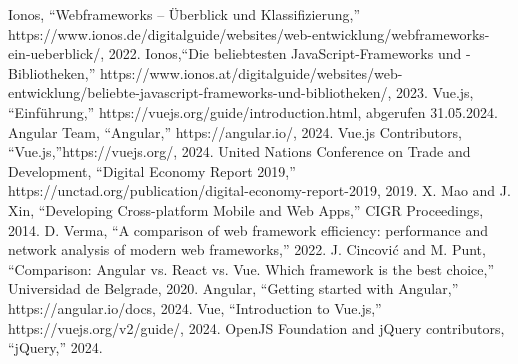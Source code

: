 \documentclass[conference]{IEEEtran}
\begin{document}
\begin{thebibliography}{00}
 Ionos, ``Webframeworks – Überblick und Klassifizierung,'' https://www.ionos.de/digitalguide/websites/web-entwicklung/webframeworks-ein-ueberblick/, 2022.
 Ionos,``Die beliebtesten JavaScript-Frameworks und -Bibliotheken,'' https://www.ionos.at/digitalguide/websites/web-entwicklung/beliebte-javascript-frameworks-und-bibliotheken/, 2023.
 Vue.js, ``Einführung,'' https://vuejs.org/guide/introduction.html, abgerufen 31.05.2024.
 Angular Team, ``Angular,'' https://angular.io/, 2024.
 Vue.js Contributors, ``Vue.js,''https://vuejs.org/, 2024.
 United Nations Conference on Trade and Development, ``Digital Economy Report 2019,'' https://unctad.org/publication/digital-economy-report-2019, 2019.
 X. Mao and J. Xin, ``Developing Cross-platform Mobile and Web Apps,'' CIGR Proceedings, 2014.
 D. Verma, ``A comparison of web framework efficiency: performance and network analysis of modern web frameworks,'' 2022.
 J. Cincović and M. Punt, ``Comparison: Angular vs. React vs. Vue. Which framework is the best choice,'' Universidad de Belgrade, 2020.
 Angular, ``Getting started with Angular,'' https://angular.io/docs, 2024.
 Vue, ``Introduction to Vue.js,'' https://vuejs.org/v2/guide/, 2024.
 OpenJS Foundation and jQuery contributors, ``jQuery,'' 2024.
\end{thebibliography}
\vspace{12pt}
\color{red}


\end{document}
